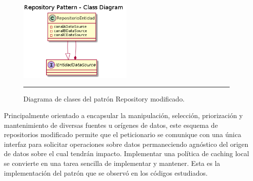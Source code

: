  \begin{figure}[htbp]
 	\centering
 	\includegraphics[width=0.5\textwidth]{Figures/uml_clases_modif_repository.png}
 	\rule{35em}{1pt}
 	\caption[Modified Repository Pattern Class Diagram]{Diagrama de clases del patrón Repository modificado.}
 	\label{fig:uml_clases_modif_repository}
 \end{figure}

Principalmente orientado a encapsular la manipulación, selección, priorización y mantenimiento de diversas fuentes u orígenes de datos, este esquema de repositorios modificado permite que el peticionario se comunique con una única interfaz para solicitar operaciones sobre datos permaneciendo agnóstico del origen de datos sobre el cual tendrán impacto. 
Implementar una política de caching local se convierte en una tarea sencilla de implementar y mantener.
Esta es la implementación del patrón que se observó en los códigos estudiados.
% 
